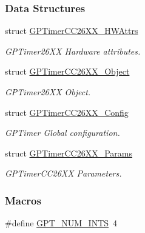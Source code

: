 \subsubsection*{Data Structures}
\begin{DoxyCompactItemize}
\item 
struct \hyperlink{struct_g_p_timer_c_c26_x_x___h_w_attrs}{G\+P\+Timer\+C\+C26\+X\+X\+\_\+\+H\+W\+Attrs}
\begin{DoxyCompactList}\small\item\em G\+P\+Timer26\+X\+X Hardware attributes. \end{DoxyCompactList}\item 
struct \hyperlink{struct_g_p_timer_c_c26_x_x___object}{G\+P\+Timer\+C\+C26\+X\+X\+\_\+\+Object}
\begin{DoxyCompactList}\small\item\em G\+P\+Timer26\+X\+X Object. \end{DoxyCompactList}\item 
struct \hyperlink{struct_g_p_timer_c_c26_x_x___config}{G\+P\+Timer\+C\+C26\+X\+X\+\_\+\+Config}
\begin{DoxyCompactList}\small\item\em G\+P\+Timer Global configuration. \end{DoxyCompactList}\item 
struct \hyperlink{struct_g_p_timer_c_c26_x_x___params}{G\+P\+Timer\+C\+C26\+X\+X\+\_\+\+Params}
\begin{DoxyCompactList}\small\item\em G\+P\+Timer\+C\+C26\+X\+X Parameters. \end{DoxyCompactList}\end{DoxyCompactItemize}
\subsubsection*{Macros}
\begin{DoxyCompactItemize}
\item 
\#define \hyperlink{_g_p_timer_c_c26_x_x_8h_ae8166f42d637bc48b784b2524e49d0fe}{G\+P\+T\+\_\+\+N\+U\+M\+\_\+\+I\+N\+T\+S}~4
\end{DoxyCompactItemize}
